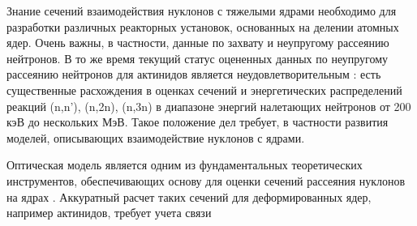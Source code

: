 
Знание сечений взаимодействия нуклонов с тяжелыми ядрами необходимо для разработки различных реакторных установок, основанных на делении атомных ядер. Очень важны, в частности, данные по захвату и неупругому рассеянию нейтронов. В то же время текущий статус оцененных данных по неупругому рассеянию нейтронов для актинидов является неудовлетворительным \cite{INDCReport2012}: есть существенные расхождения в оценках сечений и энергетических распределений реакций (n,n’), (n,2n), (n,3n) в диапазоне энергий налетающих нейтронов от 200 кэВ до нескольких МэВ. Такое положение дел требует, в частности развития моделей, описывающих взаимодействие нуклонов с ядрами. 


Оптическая модель является одним из фундаментальных теоретических инструментов, обеспечивающих основу для оценки сечений рассеяния нуклонов на ядрах \cite{HodgsonBookRus}. Аккуратный расчет таких сечений для деформированных ядер, например актинидов, требует учета связи 

